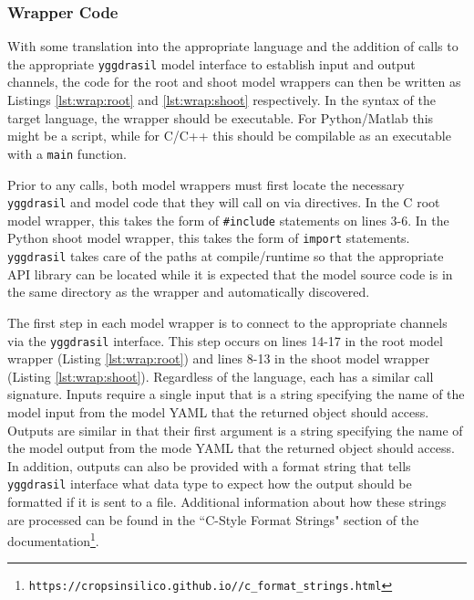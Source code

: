 \documentclass[journal]{IEEEtran}
\newcommand{\todo}[1]{{\color{red}{#1}}}
\newcommand{\pkg}{{\tt yggdrasil}{}}
\newcommand{\pkglink}{\todo{cis\_interface}}
\newcommand{\rootwrap}{}
\newcommand{\shootwrap}{}
\begin{document}
\subsubsection{Wrapper Code}
%
With some translation into the appropriate language and the addition of calls to the appropriate {\pkg} model interface to establish input and output channels, the code for the root and shoot model wrappers can then be written as Listings \ref{lst:wrap:root} and \ref{lst:wrap:shoot} respectively. In the syntax of the target language, the wrapper should be executable. For Python/Matlab this might be a script, while for C/C++ this should be compilable as an executable with a {\tt main} function.
%
\rootwrap
%
\shootwrap
%
Prior to any calls, both model wrappers must first locate the necessary {\pkg} and model code that they will call on via directives. In the C root model wrapper, this takes the form of {\tt \#include} statements on lines 3-6. In the Python shoot model wrapper, this takes the form of {\tt import} statements. {\pkg} takes care of the paths at compile/runtime so that the appropriate API library can be located while it is expected that the model source code is in the same directory as the wrapper and automatically discovered.

The first step in each model wrapper is to connect to the appropriate channels via the {\pkg} interface. This step occurs on lines 14-17 in the root model wrapper (Listing \ref{lst:wrap:root}) and lines 8-13 in the shoot model wrapper (Listing \ref{lst:wrap:shoot}). Regardless of the language, each has a similar call signature. Inputs require a single input that is a string specifying the name of the model input from the model YAML that the returned object should access. Outputs are similar in that their first argument is a string specifying the name of the model output from the mode YAML that the returned object should access. In addition, outputs can also be provided with a format string that tells {\pkg} interface what data type to expect how the output should be formatted if it is sent to a file. Additional information about how these strings are processed can be found in the ``C-Style Format Strings" section of the documentation\footnote{{\tt https://cropsinsilico.github.io/\pkglink/c\_format\_strings.html}}.
\end{document}
